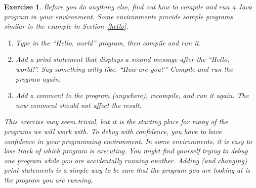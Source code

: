 \documentclass[12pt]{book}
\theoremstyle{exercise}
\newtheorem{exercise}{Exercise}[chapter]
\begin{document}
\begin{exercise}

Before you do anything else, find out how to compile and run a Java program in your environment.
Some environments provide sample programs similar to the example in Section~\ref{hello}.

\begin{enumerate}
\item Type in the ``Hello, world'' program, then compile and run it.

\item Add a print statement that displays a second message after the ``Hello, world!''.
Say something witty like, ``How are you?''
Compile and run the program again.

\item Add a comment to the program (anywhere), recompile, and run it again.
The new comment should not affect the result.
\end{enumerate}

This exercise may seem trivial, but it is the starting place for many of the programs we will work with.
To debug with confidence, you have to have confidence in your programming environment.
In some environments, it is easy to lose track of which program is executing.
You might find yourself trying to debug one program while you are accidentally running another.
Adding (and changing) print statements is a simple way to be sure that the program you are looking at is the program you are running.

\end{exercise}
\end{document}
